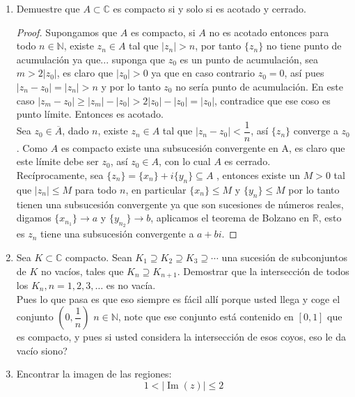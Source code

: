 \documentclass[11pt]{article}
\begin{document}
\begin{enumerate}
    \item Demuestre que \( A \subset \mathbb{C} \) es compacto si y solo si es acotado y cerrado.

    \begin{proof}
    Supongamos que $A$ es compacto, si $A$ no es acotado entonces para todo $n\in \mathbb{N}$, existe $z_n\in A$ tal que $|z_n|>n$, por tanto $\{z_n\}$ no tiene punto de acumulación ya que... suponga que $z_0$ es un punto de acumulación, sea $m>2|z_0|$, es claro que $|z_0|>0$ ya que en caso contrario $z_0=0$, así pues $|z_n-z_0|=|z_n|>n$ y por lo tanto $z_0$ no sería punto de acumulación. En este caso $|z_m-z_0|\geq |z_m|-|z_0|>2|z_0|-|z_0|=|z_0|$, contradice que ese coso es punto límite. Entonces es acotado.\\

    Sea $z_0\in \overline{A}$, dado $n$, existe $z_n\in A$ tal que $|z_n-z_0|<\dfrac{1}{n}$, así $\{z_n\}$ converge a $z_0$. Como $A$ es compacto existe una subsucesión convergente en A, es claro que este límite debe ser $z_0$, así $z_0\in A$, con lo cual $A$ es cerrado.\\

    Recíprocamente, sea $\{z_n\}=\{x_n\}+i\{y_n\}\subseteq A$ , entonces existe un $M>0$ tal que $|z_n|\leq M$ para todo $n$, en particular $\{x_n\}\leq M$ y $\{y_n\}\leq M$ por lo tanto tienen una subsucesión convergente ya que son sucesiones de números reales, digamos $\{x_{n_1}\}\to a$ y $\{y_{n_2}\}\to b$, aplicamos el teorema de Bolzano en $\mathbb{R}$, esto es $z_n$ tiene una subsucesión convergente a $a+bi$.
    \end{proof}

    \item Sea \( K \subset \mathbb{C} \) compacto. Sean \( K_1 \supseteq K_2 \supseteq K_3 \supseteq \cdots \) una sucesión de subconjuntos de \( K \) no vacíos, tales que \( K_n \supseteq K_{n+1} \). Demostrar que la intersección de todos los \( K_n, n = 1, 2, 3, \ldots \) es no vacía.\\

    Pues lo que pasa es que eso siempre es  fácil allí porque usted llega y coge el conjunto $\left(0,\dfrac{1}{n}\right)$ $n\in \mathbb{N}$, note que ese conjunto está contenido en $[0,1]$ que es compacto, y pues si usted considera la intersección de esos coyos, eso le da vacío siono?

    \item Encontrar la imagen de las regiones:
    \[1 < | \operatorname{Im}(z) | \leq 2\]


\end{enumerate}
\end{document}
